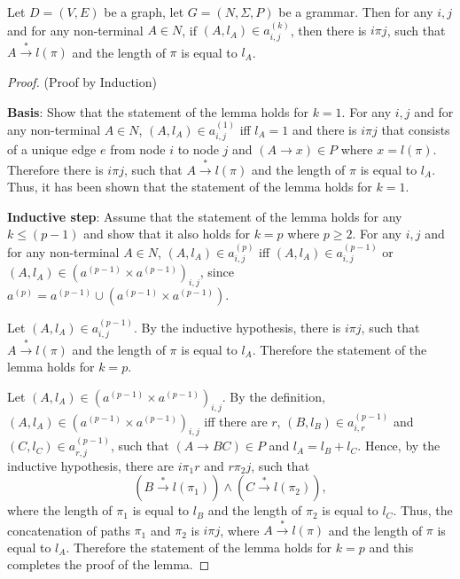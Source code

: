 \begin{lemma}\label{lemma:singlepath}
	Let $D = (V,E)$ be a graph, let $G =(N,\Sigma,P)$ be a grammar. Then for any $i, j$ and for any non-terminal $A \in N$, if $(A,l_A) \in a^{(k)}_{i,j}$, then there is $i \pi j$, such that $A \xrightarrow{*} l(\pi)$ and the length of $\pi$ is equal to $l_A$.
\end{lemma}
\begin{proof}(Proof by Induction)
	
	\textbf{Basis}: Show that the statement of the lemma holds for $k = 1$. For any $i, j$ and for any non-terminal $A \in N$, $(A, l_A) \in a^{(1)}_{i,j}$ iff $l_A = 1$ and there is $i \pi j$ that consists of a unique edge $e$ from node $i$ to node $j$ and $(A \rightarrow x) \in P$ where $x = l(\pi)$. Therefore there is $i \pi j$, such that $A \xrightarrow{*} l(\pi)$ and the length of $\pi$ is equal to $l_A$. Thus, it has been shown that the statement of the lemma holds for $k = 1$.
	
	\textbf{Inductive step}: Assume that the statement of the lemma holds for any $k \leq (p - 1)$ and show that it also holds for $k = p$ where $p \geq 2$. For any $i, j$ and for any non-terminal $A \in N$, $(A, l_A) \in a^{(p)}_{i,j}$ iff $(A, l_A) \in a^{(p-1)}_{i,j}$ or $(A, l_A) \in (a^{(p-1)} \times a^{(p-1)})_{i,j}$, since $a^{(p)} = a^{(p-1)} \cup (a^{(p-1)} \times a^{(p-1)}).$
	
	Let $(A, l_A) \in a^{(p-1)}_{i,j}$. By the inductive hypothesis, there is $i \pi j$, such that $A \xrightarrow{*} l(\pi)$ and the length of $\pi$ is equal to $l_A$. Therefore the statement of the lemma holds for $k = p$.
	
	Let $(A, l_A) \in (a^{(p-1)} \times a^{(p-1)})_{i,j}$. By the definition, $(A, l_A) \in (a^{(p-1)} \times a^{(p-1)})_{i,j}$ iff there are $r$, $(B, l_B) \in a^{(p-1)}_{i,r}$ and $(C, l_C) \in a^{(p-1)}_{r,j}$, such that $(A \rightarrow B C) \in P$ and $l_A = l_B + l_C$. Hence, by the inductive hypothesis, there are $i \pi_1 r$ and $r \pi_2 j$, such that $$(B \xrightarrow{*} l(\pi_1)) \wedge(C \xrightarrow{*} l(\pi_2)),$$ where the length of $\pi_1$ is equal to $l_B$ and the length of $\pi_2$ is equal to $l_C$. Thus, the concatenation of paths $\pi_1$ and $\pi_2$ is $i \pi j$, where $A \xrightarrow{*} l(\pi)$ and the length of $\pi$ is equal to $l_A$. Therefore the statement of the lemma holds for $k = p$ and this completes the proof of the lemma.
\end{proof}

